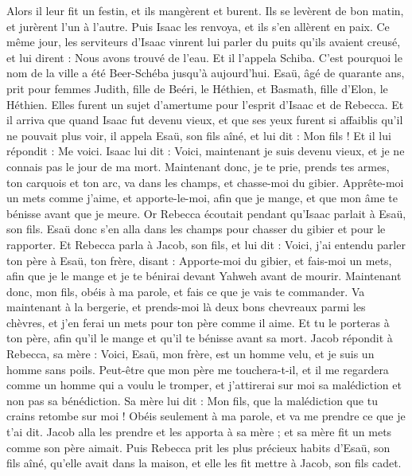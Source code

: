 \begin{multicols}{2}
Alors il leur fit un festin, et ils mangèrent et burent.
Ils se levèrent de bon matin, et jurèrent l'un à l'autre. Puis Isaac les renvoya, et ils s'en allèrent en paix.
Ce même jour, les serviteurs d'Isaac vinrent lui parler du puits qu'ils avaient creusé, et lui dirent : Nous avons trouvé de l'eau.
Et il l'appela Schiba. C'est pourquoi le nom de la ville a été Beer-Schéba jusqu'à aujourd'hui.
Esaü, âgé de quarante ans, prit pour femmes Judith, fille de Beéri, le Héthien, et Basmath, fille d'Elon, le Héthien.
Elles furent un sujet d'amertume pour l'esprit d'Isaac et de Rebecca.
\VerseOne{}Et il arriva que quand Isaac fut devenu vieux, et que ses yeux furent si affaiblis qu'il ne pouvait plus voir, il appela Esaü, son fils aîné, et lui dit : Mon fils ! Et il lui répondit : Me voici.
Isaac lui dit : Voici, maintenant je suis devenu vieux, et je ne connais pas le jour de ma mort.
Maintenant donc, je te prie, prends tes armes, ton carquois et ton arc, va dans les champs, et chasse-moi du gibier.
Apprête-moi un mets comme j'aime, et apporte-le-moi, afin que je mange, et que mon âme te bénisse avant que je meure.
Or Rebecca écoutait pendant qu'Isaac parlait à Esaü, son fils. Esaü donc s'en alla dans les champs pour chasser du gibier et pour le rapporter.
Et Rebecca parla à Jacob, son fils, et lui dit : Voici, j'ai entendu parler ton père à Esaü, ton frère, disant :
Apporte-moi du gibier, et fais-moi un mets, afin que je le mange et je te bénirai devant Yahweh avant de mourir.
Maintenant donc, mon fils, obéis à ma parole, et fais ce que je vais te commander.
Va maintenant à la bergerie, et prends-moi là deux bons chevreaux parmi les chèvres, et j'en ferai un mets pour ton père comme il aime.
Et tu le porteras à ton père, afin qu'il le mange et qu'il te bénisse avant sa mort.
Jacob répondit à Rebecca, sa mère : Voici, Esaü, mon frère, est un homme velu, et je suis un homme sans poils.
Peut-être que mon père me touchera-t-il, et il me regardera comme un homme qui a voulu le tromper, et j'attirerai sur moi sa malédiction et non pas sa bénédiction.
Sa mère lui dit : Mon fils, que la malédiction que tu crains retombe sur moi ! Obéis seulement à ma parole, et va me prendre ce que je t'ai dit.
Jacob alla les prendre et les apporta à sa mère ; et sa mère fit un mets comme son père aimait.
Puis Rebecca prit les plus précieux habits d'Esaü, son fils aîné, qu'elle avait dans la maison, et elle les fit mettre à Jacob, son fils cadet.

\end{multicols}

